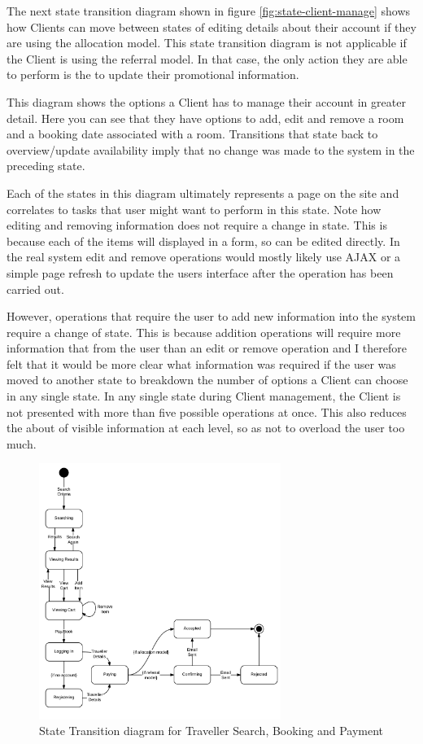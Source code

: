 \documentclass{article}
\begin{document}
The next state transition diagram shown in figure \ref{fig:state-client-manage} shows how Clients can move between states of editing details about their account if they are using the allocation model. This state transition diagram is not applicable if the Client is using the referral model. In that case, the only action they are able to perform is the to update their promotional information.

This diagram shows the options a Client has to manage their account in greater detail. Here you can see that they have options to add, edit and remove a room and a booking date associated with a room. Transitions that state back to overview/update availability imply that no change was made to the system in the preceding state.

Each of the states in this diagram ultimately represents a page on the site and correlates to tasks that user might want to perform in this state. Note how editing and removing information does not require a change in state. This is because each of the items will displayed in a form, so can be edited directly. In the real system edit and remove operations would mostly likely use AJAX or a simple page refresh to update the users interface after the operation has been carried out.

However, operations that require the user to add new information into the system require a change of state. This is because addition operations will require more information that from the user than an edit or remove operation and I therefore felt that it would be more clear what information was required if the user was moved to another state to breakdown the number of options a Client can choose in any single state. In any single state during Client management, the Client is not presented with more than five possible operations at once. This also reduces the about of visible information at each level, so as not to overload the user too much.

\begin{figure}[H]
\centering
\includegraphics[width=0.7\textwidth]{img/state_diagrams/StateTransitionDiagramUserPayement.png}
\caption{State Transition diagram for Traveller Search, Booking and Payment}
\label{fig:state-traveller-book}
\end{figure}
\end{document}
